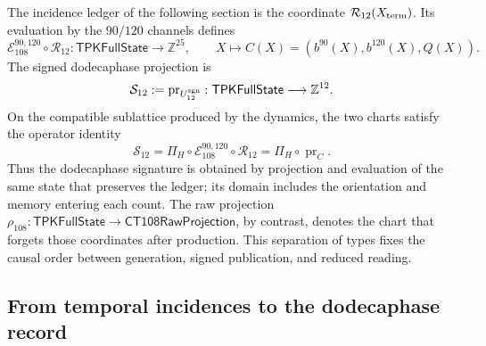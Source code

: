 The incidence ledger of the following section is the coordinate
\(\mathcal R_{12}(X_{\rm term})\). Its evaluation by the
\(90/120\) channels defines
\[
 \mathcal E_{108}^{90,120}\circ\mathcal R_{12}:
 \mathsf{TPKFullState}\longrightarrow\mathbb Z^{25},
 \qquad
 X\longmapsto C(X)=(b^{90}(X),b^{120}(X),Q(X)).
\]
The signed dodecaphase projection is
\[
 \mathcal S_{12}:=\operatorname{pr}_{U_{12}^{\rm sgn}}:
 \mathsf{TPKFullState}\longrightarrow\mathbb Z^{12}.
\]
On the compatible sublattice produced by the dynamics, the two charts
satisfy the operator identity
\begin{equation}
 \mathcal S_{12}
 =\Pi_H\circ\mathcal E_{108}^{90,120}\circ\mathcal R_{12}
 =\Pi_H\circ\operatorname{pr}_{C}.
 \label{vi:dep:identidad-productor-e108}
\end{equation}
Thus the dodecaphase signature is obtained by projection and evaluation of the same
state that preserves the ledger; its domain includes the orientation and memory
entering each count. The raw projection
\(\rho_{108}:\mathsf{TPKFullState}\to\mathsf{CT108RawProjection}\),
by contrast, denotes the chart that forgets those coordinates after
production. This separation of types fixes the causal order between generation,
signed publication, and reduced reading.

\subsection{From temporal incidences to the dodecaphase record}
\label{vi:dep:registro}\label{subsec:k-registro-integral}


